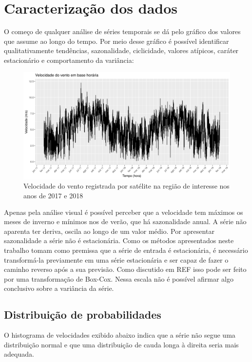 \documentclass[
	12pt,				%
	openright,			%
	oneside,			%
	a4paper,			%
	english,			%
	french,				%
	spanish,			%
	brazil				%
	]{abntex2}
\begin{document}
\chapter{Caracterização dos dados}

O começo de qualquer análise de séries temporais se dá pelo gráfico dos valores que assume ao longo do tempo. Por meio desse gráfico é possível identificar qualitativamente tendências, sazonalidade, ciclicidade, valores atípicos, caráter estacionário e comportamento da variância:

\begin{figure}[h]
    \centering
	\includegraphics[width=\textwidth]{entire_series_hourly_basis.png}
	\caption{Velocidade do vento registrada por satélite na região de interesse nos anos de 2017 e 2018}
\end{figure}
\FloatBarrier

Apenas pela análise visual é possível perceber que a velocidade tem máximos os meses de inverno e mínimos nos de verão, que há sazonalidade anual. A série não aparenta ter deriva, oscila ao longo de um valor médio. Por apresentar sazonalidade a série não é estacionária. Como os métodos apresentados neste trabalho tomam como premissa que a série de entrada é estacionária, é necessário transformá-la previamente em uma série estacionária e ser capaz de fazer o caminho reverso após a sua previsão. Como discutido em REF isso pode ser feito por uma transformação de Box-Cox. Nessa escala não é possível afirmar algo conclusivo sobre a variância da série.

\section{Distribuição de probabilidades}

O histograma de velocidades exibido abaixo indica que a série não segue uma distribuição normal e que uma distribuição de cauda longa à direita seria mais adequada. 
\end{document}
